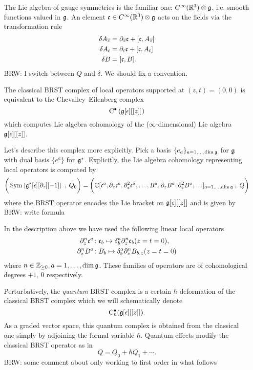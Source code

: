 \documentclass[11pt]{amsart}
\def\brian#1{{\textcolor{blue!65!red}{BRW: {#1}}}}
\begin{document}
The Lie algebra of gauge symmetries is the familiar one: $C^\infty(\mathbb R^3) \otimes \mathfrak g$, i.e. smooth functions valued in $\mathfrak g$. 
An element $\mathfrak c \in C^\infty(\mathbb R^3) \otimes \mathfrak g$ acts on the fields via the transformation rule
\begin{align*}
\delta A_{\overline{z}} & = \partial_{{\overline{z}}} \mathfrak c + [\mathfrak c, A_{\overline{z}}] \\
\delta A_t & = \partial_t \mathfrak c + [\mathfrak c,A_t] \\
\delta B & = [\mathfrak c, B] .
\end{align*}
\brian{I switch between $Q$ and $\delta$. We should fix a convention.}

The classical BRST complex of local operators supported at $(z,t) = (0,0)$ is equivalent to the Chevalley--Eilenberg complex
\[
{\rm C}^\bullet \left(\mathfrak g[\epsilon][[z]]\right)
\] 
which computes Lie algebra cohomology of the ($\infty$-dimensional) Lie algebra $\mathfrak g[\epsilon][[z]]$. 


Let's describe this complex more explicitly. 
Pick a basis $\{e_a\}_{a = 1,\ldots, \dim \mathfrak g}$ for $\mathfrak g$ with dual basis $\{e^a\}$ for $\mathfrak g^*$. 
Explicitly, the Lie algebra cohomology representing local operators is computed by 
\[
\bigg(\operatorname{Sym}\left(\mathfrak g^*[\epsilon] [\partial_z] [-1] \right) \; , \; Q_0 \bigg) = \bigg(\mathbb C[\mathfrak c^a, \partial_z \mathfrak c^a , \partial^2_z \mathfrak c^a, \ldots, B^a , \partial_z B^a , \partial_z^2 B^a, \ldots]_{a=1, \ldots, \dim \mathfrak g} \; , \; Q \bigg)
\]
where the BRST operator encodes the Lie bracket on $\mathfrak g[\epsilon][[z]]$ and is given by \brian{write formula}

In the description above we have used the following linear local operators
\begin{align*}
\partial_z^n \mathfrak c^a \colon & \mathfrak c_b \mapsto \delta_b^a \partial^n_z \mathfrak c_b (z=t=0), \\
\partial_z^n B^a \colon & B_b \mapsto \delta_b^a \partial_z^n B_{b,z} (z=t=0) 
\end{align*}
where $n \in \mathbb Z_{\geq 0}, a = 1,\ldots, \dim \mathfrak g$. 
These families of operators are of cohomological degrees $+1$, $0$ respectively. 

Perturbatively, the {\em quantum} BRST complex is a certain $\hbar$-deformation of the classical BRST complex which we will schematically denote
\[
{\rm C}^\bullet_\hbar (\mathfrak g[\epsilon][[z]])  .
\]
As a graded vector space, this quantum complex is obtained from the classical one simply by adjoining the formal variable $\hbar$. 
Quantum effects modify the classical BRST operator as in
\[
Q = Q_0 + \hbar Q_1 + \cdots .
\]
\brian{some comment about only working to first order in what follows}
\end{document}
